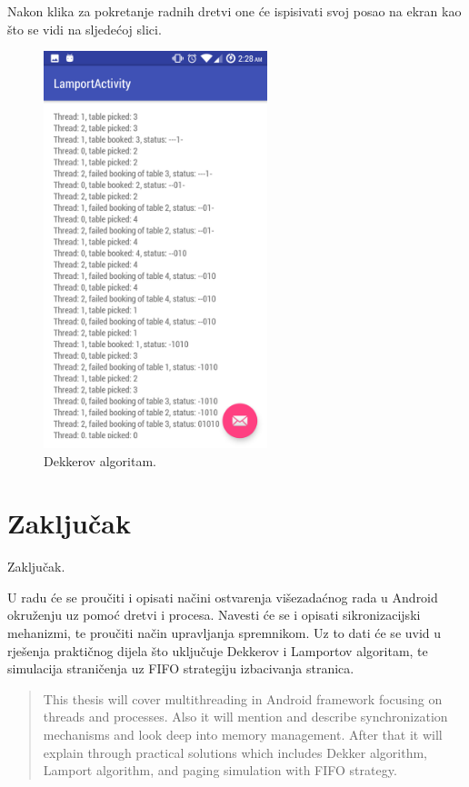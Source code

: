 \documentclass[times, utf8, zavrsni]{fer}
\begin{document}
Nakon klika za pokretanje radnih dretvi one će ispisivati svoj posao na ekran kao što  se vidi na sljedećoj slici.

\begin{figure}[ht!]
\centering
\includegraphics[width=65mm]{img/LamportActivity.png}
\caption{Dekkerov algoritam.}
\label{overflow}
\end{figure}

\chapter{Zaključak}
Zaključak.




\begin{sazetak}
U radu će se proučiti i opisati načini ostvarenja višezadaćnog rada u Android okruženju uz pomoć dretvi i procesa. Navesti će se i opisati sikronizacijski mehanizmi, te proučiti način upravljanja spremnikom. Uz to dati će se uvid u rješenja praktičnog dijela što uključuje Dekkerov i Lamportov algoritam, te simulacija straničenja uz FIFO strategiju izbacivanja stranica.

\end{sazetak}

\begin{abstract}
This thesis will cover multithreading in Android framework focusing on threads and processes. Also it will mention and describe synchronization mechanisms and look deep into memory management. After that it will explain through practical solutions which includes Dekker algorithm, Lamport algorithm, and paging simulation with FIFO strategy.

\end{abstract}
\end{document}
